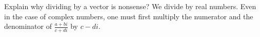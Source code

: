{Explain why  dividing by a vector is nonsense?
}
{
We divide by real numbers.  Even in the case of complex numbers, one must first multiply the numerator and the denominator of $\frac{a+bi}{c+di}$ by $c-di$.  
}